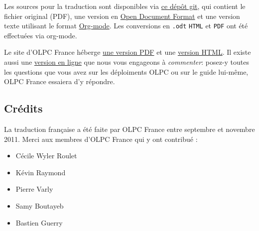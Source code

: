 \documentclass[11pt]{article}
\begin{document}
Les sources pour la traduction sont disponibles via \href{https://github.com/bzg/OLPC-Deployment--community--guide}{ce dépôt git}, qui
contient le fichier original (PDF), une version en \href{http://fr.wikipedia.org/wiki/OpenDocument}{Open Document Format} et
une version texte utilisant le format \href{http://orgmode.org}{Org-mode}.  Les conversions en \texttt{.odt}
\texttt{HTML} et \texttt{PDF} ont été effectuées via org-mode.

Le site d'OLPC France héberge \href{http://olpc-france.org/guide-deploiement/olpc-guide-deploiement.pdf}{une version PDF} et une \href{http://olpc-france.org/guide-deploiement/olpc-guide-deploiement.html}{version HTML}.  Il
existe aussi une \href{http://olpc-france.org/guide-deploiement/index.html}{version en ligne} que nous vous engageons à \emph{commenter}:
posez-y toutes les questions que vous avez sur les déploiments OLPC ou 
sur le guide lui-même, OLPC France essaiera d'y répondre.
\subsection{Crédits}
\label{sec-13-3}


La traduction française a été faite par OLPC France entre septembre et
novembre 2011.  Merci aux membres d'OLPC France qui y ont contribué :

\begin{itemize}
\item Cécile Wyler Roulet
\item Kévin Raymond
\item Pierre Varly
\item Samy Boutayeb
\item Bastien Guerry
\end{itemize}
\end{document}

